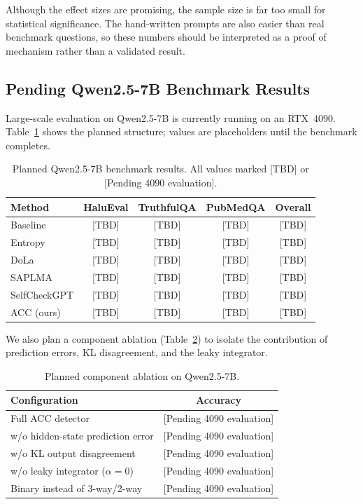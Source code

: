\documentclass[letterpaper]{article}
\begin{document}
Although the effect sizes are promising, the sample size is far too small for statistical significance. The hand-written prompts are also easier than real benchmark questions, so these numbers should be interpreted as a proof of mechanism rather than a validated result.

\subsection{Pending Qwen2.5-7B Benchmark Results}

Large-scale evaluation on Qwen2.5-7B is currently running on an RTX~4090. Table~\ref{tab:7b_results} shows the planned structure; values are placeholders until the benchmark completes.

\begin{table}[htbp]
    \centering
    \small
    \caption{Planned Qwen2.5-7B benchmark results. All values marked [TBD] or [Pending 4090 evaluation].}
    \label{tab:7b_results}
    \begin{tabular}{lcccc}
        \toprule
        Method & HaluEval & TruthfulQA & PubMedQA & Overall \\
        \midrule
        Baseline & [TBD] & [TBD] & [TBD] & [TBD] \\
        Entropy & [TBD] & [TBD] & [TBD] & [TBD] \\
        DoLa & [TBD] & [TBD] & [TBD] & [TBD] \\
        SAPLMA & [TBD] & [TBD] & [TBD] & [TBD] \\
        SelfCheckGPT & [TBD] & [TBD] & [TBD] & [TBD] \\
        ACC (ours) & [TBD] & [TBD] & [TBD] & [TBD] \\
        \bottomrule
    \end{tabular}
\end{table}

We also plan a component ablation (Table~\ref{tab:component_ablation}) to isolate the contribution of prediction errors, KL disagreement, and the leaky integrator.

\begin{table}[htbp]
    \centering
    \small
    \caption{Planned component ablation on Qwen2.5-7B.}
    \label{tab:component_ablation}
    \begin{tabular}{lc}
        \toprule
        Configuration & Accuracy \\
        \midrule
        Full ACC detector & [Pending 4090 evaluation] \\
        w/o hidden-state prediction error & [Pending 4090 evaluation] \\
        w/o KL output disagreement & [Pending 4090 evaluation] \\
        w/o leaky integrator ($\alpha=0$) & [Pending 4090 evaluation] \\
        Binary instead of 3-way/2-way & [Pending 4090 evaluation] \\
        \bottomrule
    \end{tabular}
\end{table}
\end{document}
